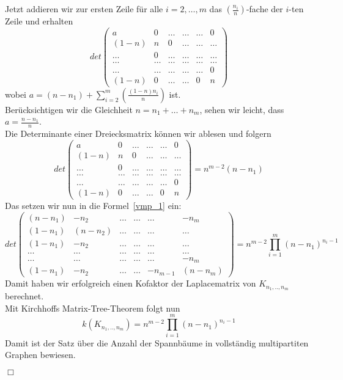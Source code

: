 Jetzt addieren wir zur ersten Zeile für alle $i=2,\ldots,m$ das $\left(\frac{n_i}{n}\right)$-fache der $i$-ten Zeile und erhalten
\begin{equation}
det
\begin{pmatrix}
 a&0&\ldots&\ldots&\ldots&0\\
 (1-n)&n&0&\ldots&\ldots&\ldots\\
 \ldots&0&\ldots&\ldots&\ldots&\ldots\\
 \ldots&\ldots&\ldots&\ldots&\ldots&\ldots\\
 \ldots&\ldots&\ldots&\ldots&\ldots&0\\
 (1-n)&0&\ldots&\ldots&0&n
\end{pmatrix}
\end{equation}
wobei $a = (n-n_1)+\sum_{i=2}^m\left(\frac{(1-n)n_i}{n}\right)$ ist.\\
Berücksichtigen wir die Gleichheit $n=n_1+\ldots+n_m$, sehen wir leicht, dass $a=\frac{n-n_1}{n}$.\\
Die Determinante einer Dreiecksmatrix können wir ablesen und folgern
\begin{equation}
det
\begin{pmatrix}
 a&0&\ldots&\ldots&\ldots&0\\
 (1-n)&n&0&\ldots&\ldots&\ldots\\
 \ldots&0&\ldots&\ldots&\ldots&\ldots\\
 \ldots&\ldots&\ldots&\ldots&\ldots&\ldots\\
 \ldots&\ldots&\ldots&\ldots&\ldots&0\\
 (1-n)&0&\ldots&\ldots&0&n
\end{pmatrix}
= n^{m-2}(n-n_1)
\end{equation}
Das setzen wir nun in die Formel~\ref{vmp_1} ein:
\begin{equation}
 det
\begin{pmatrix}
 (n-n_1)&-n_2&\ldots&\ldots&\ldots&-n_m\\
 (1-n_1)&(n-n_2)&\ldots&\ldots&\ldots&\ldots\\
 (1-n_1)&-n_2&\ldots&\ldots&\ldots&\ldots\\
 \ldots&\ldots&\ldots&\ldots&\ldots&\ldots\\
 \ldots&\ldots&\ldots&\ldots&\ldots&-n_m\\
 (1-n_1)&-n_2&\ldots&\ldots&-n_{m-1}&(n-n_m)
\end{pmatrix}
= n^{m-2}\prod_{i=1}^{m}(n-n_1)^{n_i-1}
\end{equation}
Damit haben wir erfolgreich einen Kofaktor der Laplacematrix von $K_{n_1,..,n_m}$ berechnet.\\
Mit Kirchhoffs Matrix-Tree-Theorem folgt nun
\begin{equation}
 \mathit{k}(K_{n_1,..,n_m})=n^{m-2}\prod_{i=1}^{m}(n-n_1)^{n_i-1}
\end{equation}
Damit ist der Satz über die Anzahl der Spannbäume in vollständig multipartiten Graphen bewiesen.
\begin{flushright} $\Box$ \end{flushright}
